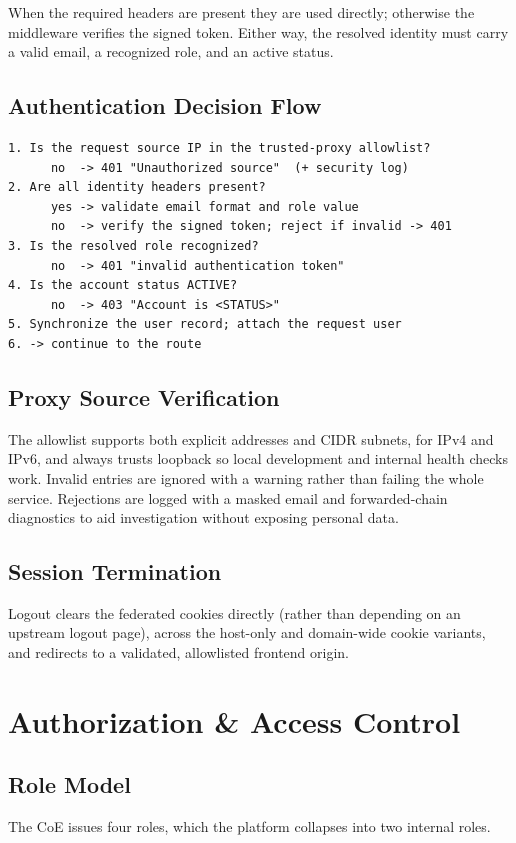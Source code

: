 \documentclass[12pt,a4paper,oneside]{report}
\begin{document}
When the required headers are present they are used directly; otherwise the
middleware verifies the signed token. Either way, the resolved identity must
carry a valid email, a recognized role, and an active status.

\section{Authentication Decision Flow}
\begin{lstlisting}[language={}]
1. Is the request source IP in the trusted-proxy allowlist?
      no  -> 401 "Unauthorized source"  (+ security log)
2. Are all identity headers present?
      yes -> validate email format and role value
      no  -> verify the signed token; reject if invalid -> 401
3. Is the resolved role recognized?
      no  -> 401 "invalid authentication token"
4. Is the account status ACTIVE?
      no  -> 403 "Account is <STATUS>"
5. Synchronize the user record; attach the request user
6. -> continue to the route
\end{lstlisting}

\section{Proxy Source Verification}
The allowlist supports both explicit addresses and CIDR subnets, for IPv4 and
IPv6, and always trusts loopback so local development and internal health checks
work. Invalid entries are ignored with a warning rather than failing the whole
service. Rejections are logged with a masked email and forwarded-chain
diagnostics to aid investigation without exposing personal data.

\section{Session Termination}
Logout clears the federated cookies directly (rather than depending on an
upstream logout page), across the host-only and domain-wide cookie variants, and
redirects to a validated, allowlisted frontend origin.

\chapter{Authorization \& Access Control}
\section{Role Model}
The CoE issues four roles, which the platform collapses into two internal roles.
\end{document}
